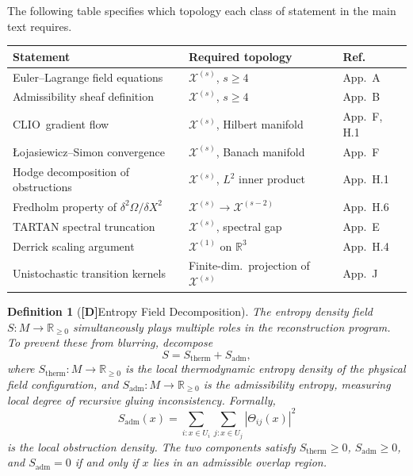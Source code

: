 \documentclass[12pt,a4paper]{article}
\newcommand{\claimD}{\textbf{[D]}\;}
\newtheorem{defn}{Definition}[section]
\newcommand{\CLIO}{\textrm{CLIO}}
\newcommand{\Field}{\mathcal{X}}
\begin{document}
The following table specifies which topology each class of statement in the
main text requires.

\bigskip
\begin{center}
{\small
\begin{tabular}{lll}
\toprule
\textbf{Statement} & \textbf{Required topology} & \textbf{Ref.}\\
\midrule
Euler--Lagrange field equations & $\Field^{(s)}$, $s\geq 4$ & App.\ A\\
Admissibility sheaf definition & $\Field^{(s)}$, $s\geq 4$ & App.\ B\\
\CLIO\ gradient flow & $\Field^{(s)}$, Hilbert manifold & App.\ F, H.1\\
Łojasiewicz--Simon convergence & $\Field^{(s)}$, Banach manifold & App.\ F\\
Hodge decomposition of obstructions & $\Field^{(s)}$, $L^2$ inner product & App.\ H.1\\
Fredholm property of $\delta^2\Omega/\delta X^2$ & $\Field^{(s)}\!\to\!\Field^{(s-2)}$ & App.\ H.6\\
TARTAN spectral truncation & $\Field^{(s)}$, spectral gap & App.~E\\
Derrick scaling argument & $\Field^{(1)}$ on $\mathbb{R}^3$ & App.\ H.4\\
Unistochastic transition kernels & Finite-dim.\ projection of $\Field^{(s)}$ & App.\ J\\
\bottomrule
\end{tabular}
}%
\end{center}

\bigskip

\begin{defn}[\claimD Entropy Field Decomposition]
The entropy density field $S:M\to\mathbb{R}_{\geq 0}$ simultaneously plays
multiple roles in the reconstruction program. To prevent these from blurring,
decompose
\[
S = S_\mathrm{therm} + S_\mathrm{adm},
\]
where $S_\mathrm{therm}:M\to\mathbb{R}_{\geq 0}$ is the local thermodynamic
entropy density of the physical field configuration, and
$S_\mathrm{adm}:M\to\mathbb{R}_{\geq 0}$ is the admissibility entropy,
measuring local degree of recursive gluing inconsistency. Formally,
\[
S_\mathrm{adm}(x)
= \sum_{i: x\in U_i}\sum_{j: x\in U_j} |\Theta_{ij}(x)|^2
\]
is the local obstruction density. The two components satisfy
$S_\mathrm{therm}\geq 0$, $S_\mathrm{adm}\geq 0$, and
$S_\mathrm{adm}=0$ if and only if $x$ lies in an admissible overlap region.
\end{defn}
\end{document}
